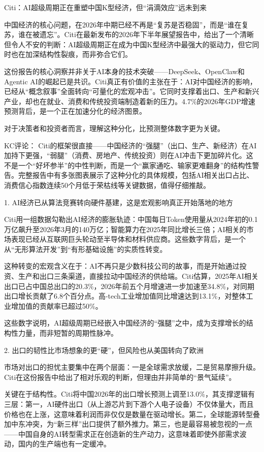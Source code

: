\documentclass[11pt]{ctexart}
\begin{document}
Citi：AI超级周期正在重塑中国K型经济，但“涓滴效应”远未到来

中国经济的核心问题，在2026年中期已经不再是“复苏是否稳固”，而是“谁在复苏，谁在被遗忘”。Citi在最新发布的2026年下半年展望报告中，给出了一个清晰但令人不安的判断：AI超级周期正在成为中国K型经济中最强大的驱动力，但它同时也在加深结构性裂痕，而非弥合它们。

这份报告的核心洞察并非关于AI本身的技术突破——DeepSeek、OpenClaw和Agentic AI的崛起已是共识。Citi真正有价值的主张在于：AI对中国经济的影响，已经从“概念叙事”全面转向“可量化的宏观冲击”。它同时支撑着出口、生产和新兴产业，却也在就业、消费和传统投资端制造着新的压力。4.7\%的2026年GDP增速预测背后，是一个正在加速分化的经济图景。

对于决策者和投资者而言，理解这种分化，比预测整体数字更为关键。

KC评论： Citi的框架很直接——中国经济的“强腿”（出口、生产、新经济）在AI加持下更强，“弱腿”（消费、房地产、传统投资）则在AI冲击下更加碎片化。这不是一个“好坏参半”的中性判断，而是一个“赢家通吃、输家更难翻身”的结构性警告。完整报告中有多张图表展示了这种分化的具体规模，包括AI相关出口占比、消费信心指数连续50个月低于荣枯线等关键数据，值得仔细推敲。

1. AI经济已从算法竞赛转向硬件基建，这是宏观影响真正开始落地的地方

Citi用一组数据勾勒出AI经济的膨胀轨迹：中国每日Token使用量从2024年初的0.1万亿飙升至2026年3月的140万亿；智能算力在2025年同比增长三倍；AI相关的市场表现已经从互联网巨头轮动至半导体和材料供应商。这些数字背后，是一个从“无形算法开发”到“有形基础设施”的实质性转变。

这种转变的宏观含义在于：AI不再只是少数科技公司的故事，而是开始通过投资、生产和出口三条渠道，直接拉动中国经济的供给端。Citi估算，2025年AI相关出口已占中国总出口的20.3\%，2026年前五个月增速进一步加速至34.8\%，对同期出口增长贡献了6.8个百分点。高-tech工业增加值同比增速达到13.1\%，对整体工业增加值的贡献率已超过50\%。

这些数字说明，AI超级周期已经嵌入中国经济的“强腿”之中，成为支撑增长的结构性力量，而非短暂的周期性脉冲。

2. 出口的韧性比市场想象的更“硬”，但风险也从美国转向了欧洲

市场对出口的担忧主要集中在两个层面：一是全球需求放缓，二是贸易摩擦升级。Citi在这份报告中给出了相对乐观的判断，但理由并非简单的“景气延续”。

关键在于结构性。Citi将中国2026年的出口增长预测上调至13.0\%，其支撑逻辑有三层：第一，AI硬件出口（从上游芯片到下游个人电子设备）不仅体量大，而且价格也在上涨，这意味着利润而非仅仅是数量在驱动增长。第二，全球能源转型叠加中东冲突，为“新三样”出口提供了额外推力。第三，也是最容易被忽视的一点——中国自身的AI转型需求正在创造新的生产动力，这意味着即使外部需求波动，国内的生产端也有一定缓冲。
\end{document}
